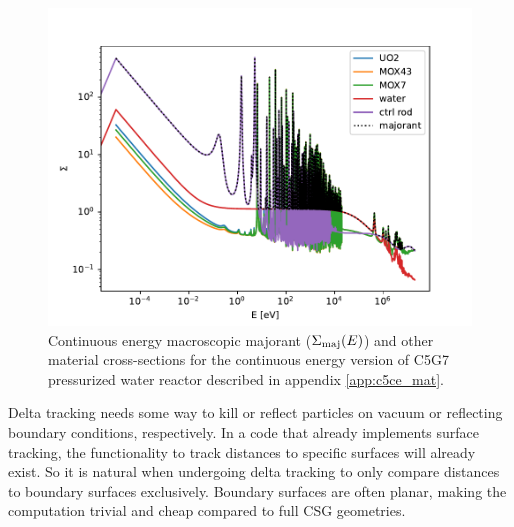\begin{figure}
    \centering
    \includegraphics[width=\textwidth]{figures/delta_figs/macro_majorant_c5ce.pdf}
    \caption{Continuous energy macroscopic majorant ($\Sigma_{\text{maj}}(E)$) and other material cross-sections for the continuous energy version of C5G7 pressurized water reactor described in appendix \ref{app:c5ce_mat}.}
    \label{fig:majorant_c5ce}
\end{figure}

Delta tracking needs some way to kill or reflect particles on vacuum or reflecting boundary conditions, respectively.
In a code that already implements surface tracking, the functionality to track distances to specific surfaces will already exist.
So it is natural when undergoing delta tracking to only compare distances to boundary surfaces exclusively.
Boundary surfaces are often planar, making the computation trivial and cheap compared to full CSG geometries.


